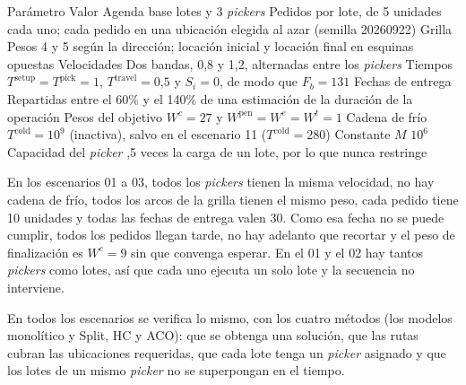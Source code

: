 \startplacetable[reference=tab:perfil_realista, location=here, title={Parámetros del perfil realista (escenarios 04 a 19).}]
	\bTABLE[split=yes, align=middle, frame=on, width=fit]
	\setupTABLE[row][1][background=color, backgroundcolor=darkgray, style=bold]
	\setupTABLE[column][1][width=4.5cm, align=flushleft]
	\setupTABLE[column][2][width=8.5cm, align=flushleft]
	\bTR \bTH Parámetro \eTH \bTH Valor \eTH \eTR
	\bTR \bTD Agenda base \eTD {} lotes y 3 {\em pickers} \eTD \eTR
	\bTR \bTD Pedidos \eTD {} por lote, de 5 unidades cada uno; cada pedido en una ubicación elegida al azar (semilla 20260922) \eTD \eTR
	\bTR \bTD Grilla \eTD \bTD Pesos 4 y 5 según la dirección; locación inicial y locación final en esquinas opuestas \eTD \eTR
	\bTR \bTD Velocidades \eTD \bTD Dos bandas, 0,8 y 1,2, alternadas entre los {\em pickers} \eTD \eTR
	\bTR \bTD Tiempos \eTD \bTD $T^{\text{setup}} = T^{\text{pick}} = 1$, $T^{\text{travel}} = 0\mathord{,}5$ y $S_i = 0$, de modo que $F_b = 131$ \eTD \eTR
	\bTR \bTD Fechas de entrega \eTD \bTD Repartidas entre el 60\% y el 140\% de una estimación de la duración de la operación \eTD \eTR
	\bTR \bTD Pesos del objetivo \eTD \bTD $W^{c} = 27$ y $W^{\text{pen}} = W^{e} = W^{t} = 1$ \eTD \eTR
	\bTR \bTD Cadena de frío \eTD \bTD $T^{\text{cold}} = 10^{9}$ (inactiva), salvo en el escenario 11 ($T^{\text{cold}} = 280$) \eTD \eTR
	\bTR \bTD Constante $M$ \eTD \bTD $10^{6}$ \eTD \eTR
	\bTR \bTD Capacidad del {\em picker} \eTD {},5 veces la carga de un lote, por lo que nunca restringe \eTD \eTR
	\eTABLE
\stopplacetable

En los escenarios 01 a 03, todos los {\em pickers} tienen la misma
velocidad, no hay cadena de frío, todos los arcos de la grilla tienen el
mismo peso, cada pedido tiene 10 unidades y todas las fechas de entrega
valen 30. Como esa fecha no se puede cumplir, todos los pedidos llegan
tarde, no hay adelanto que recortar y el peso de finalización es
$W^{c} = 9$ sin que convenga esperar. En el 01 y el 02 hay tantos
{\em pickers} como lotes, así que cada uno ejecuta un solo lote y la
secuencia no interviene.

En todos los escenarios se verifica lo mismo, con los cuatro métodos (los
modelos monolítico y Split, HC y ACO): que se
obtenga una solución, que las rutas cubran las ubicaciones requeridas, que
cada lote tenga un {\em picker} asignado y que los lotes de un mismo
{\em picker} no se superpongan en el tiempo.

